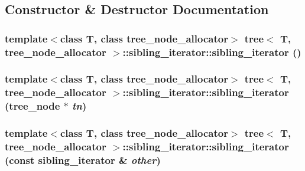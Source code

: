 \subsection{Constructor \& Destructor Documentation}
\hypertarget{classtree_1_1sibling__iterator_daaf56c800ed241d36802abab3925a2a}{
\subsubsection{\setlength{\rightskip}{0pt plus 5cm}template$<$class T, class tree\_\-node\_\-allocator$>$ {\bf tree}$<$ T, tree\_\-node\_\-allocator $>$::sibling\_\-iterator::sibling\_\-iterator ()}}
\label{classtree_1_1sibling__iterator_daaf56c800ed241d36802abab3925a2a}


\hypertarget{classtree_1_1sibling__iterator_7ddfa2fffd76fdd78b97973408a80528}{
\subsubsection{\setlength{\rightskip}{0pt plus 5cm}template$<$class T, class tree\_\-node\_\-allocator$>$ {\bf tree}$<$ T, tree\_\-node\_\-allocator $>$::sibling\_\-iterator::sibling\_\-iterator ({\bf tree\_\-node} $\ast$ {\em tn})}}
\label{classtree_1_1sibling__iterator_7ddfa2fffd76fdd78b97973408a80528}


\hypertarget{classtree_1_1sibling__iterator_8def7a6f3e109876cb003f4254885ca0}{
\subsubsection{\setlength{\rightskip}{0pt plus 5cm}template$<$class T, class tree\_\-node\_\-allocator$>$ {\bf tree}$<$ T, tree\_\-node\_\-allocator $>$::sibling\_\-iterator::sibling\_\-iterator (const {\bf sibling\_\-iterator} \& {\em other})}}
\label{classtree_1_1sibling__iterator_8def7a6f3e109876cb003f4254885ca0}


